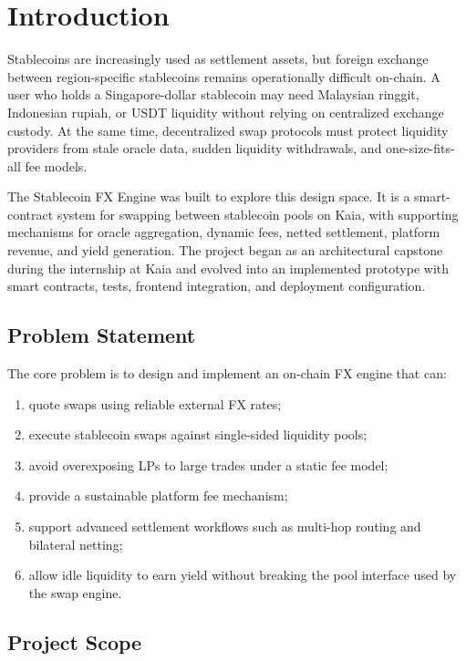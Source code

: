 \documentclass{article}
\begin{document}
\section{Introduction}

Stablecoins are increasingly used as settlement assets, but foreign exchange between region-specific stablecoins remains operationally difficult on-chain. A user who holds a Singapore-dollar stablecoin may need Malaysian ringgit, Indonesian rupiah, or USDT liquidity without relying on centralized exchange custody. At the same time, decentralized swap protocols must protect liquidity providers from stale oracle data, sudden liquidity withdrawals, and one-size-fits-all fee models.

The Stablecoin FX Engine was built to explore this design space. It is a smart-contract system for swapping between stablecoin pools on Kaia, with supporting mechanisms for oracle aggregation, dynamic fees, netted settlement, platform revenue, and yield generation. The project began as an architectural capstone during the internship at Kaia and evolved into an implemented prototype with smart contracts, tests, frontend integration, and deployment configuration.

\subsection{Problem Statement}

The core problem is to design and implement an on-chain FX engine that can:

\begin{enumerate}[leftmargin=*]
\item quote swaps using reliable external FX rates;
\item execute stablecoin swaps against single-sided liquidity pools;
\item avoid overexposing LPs to large trades under a static fee model;
\item provide a sustainable platform fee mechanism;
\item support advanced settlement workflows such as multi-hop routing and bilateral netting;
\item allow idle liquidity to earn yield without breaking the pool interface used by the swap engine.
\end{enumerate}

\subsection{Project Scope}
\end{document}
